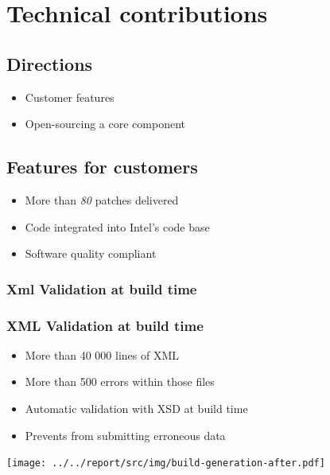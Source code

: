 %
%

\section{Technical contributions}
\subsection{Directions}
\begin{FrameWithSubSection}
    \begin{itemize}
        \item Customer features
        \item Open-sourcing a core component
    \end{itemize}
\end{FrameWithSubSection}


\subsection{Features for customers}
\begin{FrameWithSubSection}
    \begin{itemize}
        \item More than \emph{80} patches delivered
        \item Code integrated into Intel's code base
        \item Software quality compliant
    \end{itemize}
\end{FrameWithSubSection}

\subsubsection{Xml Validation at build time}
\begin{frame}
    \frametitle{XML Validation at build time}
    \begin{minipage}{0.4\textwidth}
        \begin{itemize}
            \item More than 40 000 lines of XML
            \item More than 500 errors within those files
            \item Automatic validation with XSD at build time
            \item Prevents from submitting erroneous data
        \end{itemize}
    \end{minipage}
    \begin{minipage}{0.5\textwidth}
        \flushright
        \texttt{[image: ../../report/src/img/build-generation-after.pdf]}
    \end{minipage}
\end{frame}

